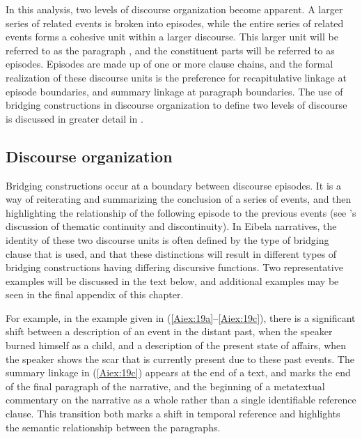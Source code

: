 \documentclass[output=paper]{LSP/langsci}
\begin{document}
In this analysis, two levels of discourse organization become apparent. A larger series of related events is broken into episodes, while the entire series of related events forms a cohesive unit within a larger discourse. This larger unit will be referred to as the paragraph \citep[corresponding to the idea of a paragraph in][372]{Thompson.et.al.2007}, and the constituent parts will be referred to as episodes. Episodes are made up of one or more clause chains, and the formal realization of these discourse units is the preference for recapitulative linkage at episode boundaries, and summary linkage at paragraph boundaries. The use of bridging constructions in discourse organization to define two levels of discourse is discussed in greater detail in \citet{Aiton.2015}.

\subsection{Discourse organization} 
\label{Aidiscourse.org}
Bridging constructions occur at a boundary between discourse episodes. It is a way of reiterating and summarizing the conclusion of a series of events, and then highlighting the relationship of the following episode to the previous events (see \citealt{devries.2005}’s discussion of thematic continuity and discontinuity). In Eibela narratives, the identity of these two discourse units is often defined by the type of bridging clause that is used, and that these distinctions will result in different types of bridging constructions having differing discursive functions. Two representative examples will be discussed in the text below, and additional examples may be seen in the final appendix of this chapter.

	For example, in the example given in (\ref{Aiex:19a}--\ref{Aiex:19c}), there is a significant shift between a description of an event in the distant past, when the speaker burned himself as a child, and a description of the present state of affairs, when the speaker shows the scar that is currently present due to these past events. The summary linkage in (\ref{Aiex:19c}) appears at the end of a text, and marks the end of the final paragraph of the narrative, and the beginning of a metatextual commentary on the narrative as a whole rather than a single identifiable reference clause. This transition both marks a shift in temporal reference and highlights the semantic relationship between the paragraphs.
	
\end{document}
